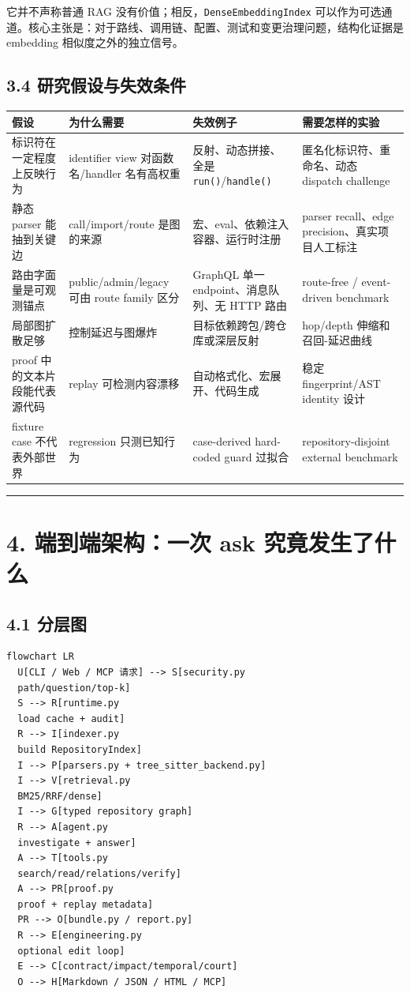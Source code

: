 \documentclass[UTF8,12pt,openany]{ctexbook}
\begin{document}
它并不声称普通 RAG 没有价值；相反，\texttt{DenseEmbeddingIndex} 可以作为可选通道。核心主张是：对于路线、调用链、配置、测试和变更治理问题，结构化证据是 embedding 相似度之外的独立信号。\par

\subsection{3.4 研究假设与失效条件}

\begin{center}
\small
\begin{longtable}{|p{}|p{}|p{}|p{}|}
\toprule
假设 & 为什么需要 & 失效例子 & 需要怎样的实验 \\
\midrule
标识符在一定程度上反映行为 & identifier view 对函数名/handler 名有高权重 & 反射、动态拼接、全是 \texttt{run()}/\texttt{handle()} & 匿名化标识符、重命名、动态 dispatch challenge \\
静态 parser 能抽到关键边 & call/import/route 是图的来源 & 宏、eval、依赖注入容器、运行时注册 & parser recall、edge precision、真实项目人工标注 \\
路由字面量是可观测锚点 & public/admin/legacy 可由 route family 区分 & GraphQL 单一 endpoint、消息队列、无 HTTP 路由 & route-free / event-driven benchmark \\
局部图扩散足够 & 控制延迟与图爆炸 & 目标依赖跨包/跨仓库或深层反射 & hop/depth 伸缩和召回-延迟曲线 \\
proof 中的文本片段能代表源代码 & replay 可检测内容漂移 & 自动格式化、宏展开、代码生成 & 稳定 fingerprint/AST identity 设计 \\
fixture case 不代表外部世界 & regression 只测已知行为 & case-derived hard-coded guard 过拟合 & repository-disjoint external benchmark \\
\bottomrule
\end{longtable}
\end{center}

\hrule

\section{4. 端到端架构：一次 ask 究竟发生了什么}

\subsection{4.1 分层图}

\begin{lstlisting}
flowchart LR
  U[CLI / Web / MCP 请求] --> S[security.py
  path/question/top-k]
  S --> R[runtime.py
  load cache + audit]
  R --> I[indexer.py
  build RepositoryIndex]
  I --> P[parsers.py + tree_sitter_backend.py]
  I --> V[retrieval.py
  BM25/RRF/dense]
  I --> G[typed repository graph]
  R --> A[agent.py
  investigate + answer]
  A --> T[tools.py
  search/read/relations/verify]
  A --> PR[proof.py
  proof + replay metadata]
  PR --> O[bundle.py / report.py]
  R --> E[engineering.py
  optional edit loop]
  E --> C[contract/impact/temporal/court]
  O --> H[Markdown / JSON / HTML / MCP]
\end{lstlisting}
\end{document}
